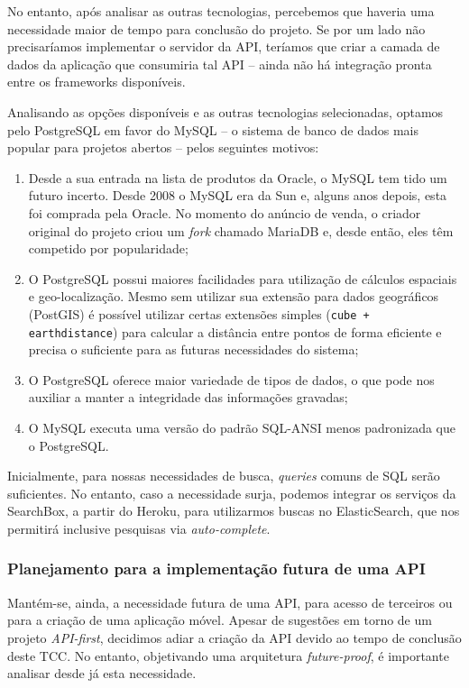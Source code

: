 \documentclass[12pt,a4paper,twoside,hyphens,english,brazil]{abntex2}
\begin{document}
{No entanto, após analisar as outras tecnologias, percebemos que haveria uma necessidade maior de tempo para conclusão do projeto. Se por um lado não precisaríamos implementar o servidor da API, teríamos que criar a camada de dados da aplicação que consumiria tal API -- ainda não há integração pronta entre os frameworks disponíveis.

Analisando as opções disponíveis e as outras tecnologias selecionadas, optamos pelo PostgreSQL em favor do MySQL -- o sistema de banco de dados mais popular para projetos abertos\cite{db-engines-ranking} -- pelos seguintes motivos:
\begin{enumerate}
	\item Desde a sua entrada na lista de produtos da Oracle, o MySQL tem tido um futuro incerto. Desde 2008 o MySQL era da Sun e, alguns anos depois, esta foi comprada pela Oracle. No momento do anúncio de venda, o criador original do projeto criou um \emph{fork} chamado MariaDB\cite{mysql-fork} e, desde então, eles têm competido por popularidade;
	\item O PostgreSQL possui maiores facilidades para utilização de cálculos espaciais e geo-localização. Mesmo sem utilizar sua extensão para dados geográficos (PostGIS) é possível utilizar certas extensões simples (\texttt{cube + earthdistance}) para calcular a distância entre pontos de forma eficiente e precisa o suficiente para as futuras necessidades do sistema\cite{postgre-earthdistance};
	\item O PostgreSQL oferece maior variedade de tipos de dados, o que pode nos auxiliar a manter a integridade das informações gravadas;
	\item O MySQL executa uma versão do padrão SQL-ANSI menos padronizada que o PostgreSQL.
\end{enumerate}

Inicialmente, para nossas necessidades de busca, \emph{queries} comuns de SQL serão suficientes. No entanto, caso a necessidade surja, podemos integrar os serviços da SearchBox, a partir do Heroku, para utilizarmos buscas no ElasticSearch, que nos permitirá inclusive pesquisas via \emph{auto-complete}.

\subsubsection{Planejamento para a implementação futura de uma API}
Mantém-se, ainda, a necessidade futura de uma API, para acesso de terceiros ou para a criação de uma aplicação móvel. Apesar de sugestões em torno de um projeto \emph{API-first}, decidimos adiar a criação da API devido ao tempo de conclusão deste TCC. No entanto, objetivando uma arquitetura \emph{future-proof}, é importante analisar desde já esta necessidade.

}
\end{document}
